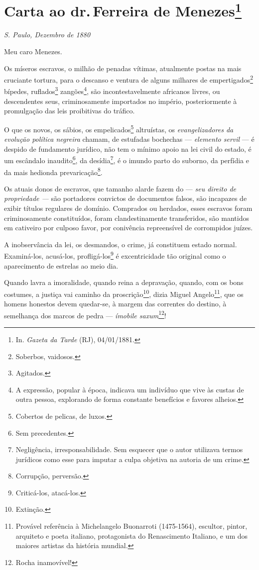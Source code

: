 \chapter{Carta ao dr.\,Ferreira de Menezes\footnote[*]{In.
  \emph{Gazeta da Tarde} (RJ), 04/01/1881.}}

\emph{S. Paulo, Dezembro de 1880}

Meu caro Menezes.

Os míseros escravos, o milhão de penadas vítimas, atualmente postas na
mais cruciante tortura, para o descanso e ventura de alguns milhares de
empertigados\footnote{Soberbos, vaidosos.} bípedes, ruflados\footnote{
  Agitados.} zangões\footnote{A expressão, popular à época, indicava
  um indivíduo que vive às custas de outra pessoa, explorando de forma
  constante benefícios e favores alheios.}, são incontestavelmente
africanos livres, ou descendentes seus, criminosamente importados no
império, posteriormente à promulgação das leis proibitivas do tráfico.

O que os novos, os sábios, os empelicados\footnote{Cobertos de
  pelicas, de luxos.} altruístas, os \emph{evangelizadores da evolução
política negreira} chamam, de estufadas bochechas --- \emph{elemento
servil} --- é despido de fundamento jurídico, não tem o mínimo apoio na
lei civil do estado, é um escândalo inaudito\footnote{Sem precedentes.},
da desídia\footnote{Negligência, irresponsabilidade. Sem esquecer que
  o autor utilizava termos jurídicos como esse para imputar a culpa
  objetiva na autoria de um crime.}, é o imundo parto do suborno, da
perfídia e da mais hedionda prevaricação\footnote{Corrupção,
  perversão.}.

Os atuais donos de escravos, que tamanho alarde fazem do --- \emph{seu
direito de propriedade ---} são portadores convictos de documentos
falsos, são incapazes de exibir títulos regulares de domínio. Comprados
ou herdados, esses escravos foram criminosamente constituídos, foram
clandestinamente transferidos, são mantidos em cativeiro por culposo
favor, por conivência repreensível de corrompidos juízes.

A inobservância da lei, os desmandos, o crime, já constituem estado
normal. Examiná-los, acusá-los, profligá-los\footnote{Criticá-los,
  atacá-los.} é excentricidade tão original como o aparecimento de
estrelas ao meio dia.

Quando lavra a imoralidade, quando reina a depravação, quando, com os
bons costumes, a justiça vai caminho da proscrição\footnote{Extinção.},
dizia Miguel Angelo\footnote{Provável referência à Michelangelo
  Buonarroti (1475-1564), escultor, pintor, arquiteto e poeta italiano,
  protagonista do Renascimento Italiano, e um dos maiores artistas da
  história mundial.}, que os homens honestos devem quedar-se, à margem
das correntes do destino, à semelhança dos marcos de pedra ---
\emph{ímobile saxum}\footnote{Rocha inamovível!}!

